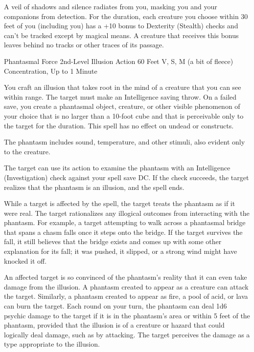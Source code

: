 \documentclass[letterpaper,openany,oneside,twocolumn]{book}
\begin{document}
A veil of shadows and silence radiates from you, masking you and your companions from detection. For the duration, each creature you choose within 30 feet of you (including you) has a +10 bonus to Dexterity (Stealth) checks and can't be tracked except by magical means. A creature that receives this bonus leaves behind no tracks or other traces of its passage.

\DndSpellHeader
  {Phantasmal Force}
  {2nd-Level Illusion}
  {Action}
  {60 Feet}
  {V, S, M (a bit of fleece)}
  {Concentration, Up to 1 Minute}

You craft an illusion that takes root in the mind of a creature that you can see within range. The target must make an Intelligence saving throw. On a failed save, you create a phantasmal object, creature, or other visible phenomenon of your choice that is no larger than a 10-foot cube and that is perceivable only to the target for the duration. This spell has no effect on undead or constructs.

The phantasm includes sound, temperature, and other stimuli, also evident only to the creature.

The target can use its action to examine the phantasm with an Intelligence (Investigation) check against your spell save DC. If the check succeeds, the target realizes that the phantasm is an illusion, and the spell ends.

While a target is affected by the spell, the target treats the phantasm as if it were real. The target rationalizes any illogical outcomes from interacting with the phantasm. For example, a target attempting to walk across a phantasmal bridge that spans a chasm falls once it steps onto the bridge. If the target survives the fall, it still believes that the bridge exists and comes up with some other explanation for its fall; it was pushed, it slipped, or a strong wind might have knocked it off.

An affected target is so convinced of the phantasm's reality that it can even take damage from the illusion. A phantasm created to appear as a creature can attack the target. Similarly, a phantasm created to appear as fire, a pool of acid, or lava can burn the target. Each round on your turn, the phantasm can deal 1d6 psychic damage to the target if it is in the phantasm's area or within 5 feet of the phantasm, provided that the illusion is of a creature or hazard that could logically deal damage, such as by attacking. The target perceives the damage as a type appropriate to the illusion.
\end{document}
